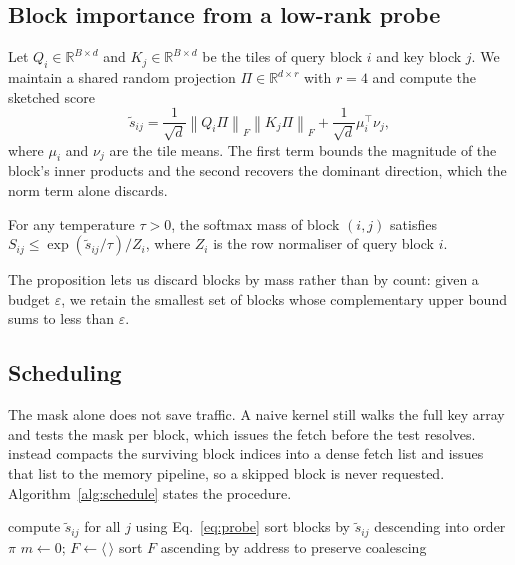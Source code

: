 \subsection{Block importance from a low-rank probe}

Let $Q_i \in \mathbb{R}^{B \times d}$ and $K_j \in \mathbb{R}^{B \times d}$ be
the tiles of query block $i$ and key block $j$. We maintain a shared random
projection $\Pi \in \mathbb{R}^{d \times r}$ with $r = 4$ and compute the
sketched score
\begin{equation}
  \label{eq:probe}
  \tilde{s}_{ij} = \frac{1}{\sqrt{d}} \left\lVert Q_i \Pi \right\rVert_{F}
                   \left\lVert K_j \Pi \right\rVert_{F}
                   + \frac{1}{\sqrt{d}} \mu_i^{\top} \nu_j,
\end{equation}
where $\mu_i$ and $\nu_j$ are the tile means. The first term bounds the
magnitude of the block's inner products and the second recovers the dominant
direction, which the norm term alone discards.

\begin{proposition}
\label{prop:bound}
For any temperature $\tau > 0$, the softmax mass of block $(i,j)$ satisfies
$S_{ij} \le \exp(\tilde{s}_{ij}/\tau) / Z_i$, where $Z_i$ is the row
normaliser of query block $i$.
\end{proposition}

The proposition lets us discard blocks by mass rather than by count: given a
budget $\varepsilon$, we retain the smallest set of blocks whose complementary
upper bound sums to less than $\varepsilon$.

\subsection{Scheduling}

The mask alone does not save traffic. A naive kernel still walks the full key
array and tests the mask per block, which issues the fetch before the test
resolves. \sysname{} instead compacts the surviving block indices into a dense
fetch list and issues that list to the memory pipeline, so a skipped block is
never requested. Algorithm~\ref{alg:schedule} states the procedure.

\begin{algorithm}[t]
  \caption{Block schedule for one query block}
  \label{alg:schedule}
  \SetAlgoLined
  compute $\tilde{s}_{ij}$ for all $j$ using Eq.~\eqref{eq:probe}\;
  sort blocks by $\tilde{s}_{ij}$ descending into order $\pi$\;
  $m \gets 0$; $F \gets \langle\,\rangle$\;
  sort $F$ ascending by address to preserve coalescing\;
\end{algorithm}


